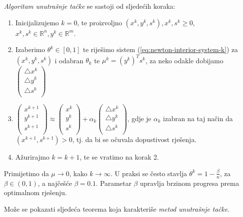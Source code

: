 \documentclass[a4paper, utf8, 11pt, colorlinks]{article}
\begin{document}
\emph{Algoritam unutrašnje tačke} se sastoji od sljedećih koraka:
\begin{enumerate}
	\item Inicijalizujemo $k=0$, te proizvoljno  $(x^k, y^k, s^k), x^k, s^k \geq 0$, $x^k,s^k \in \mathbb{R}^n, y^k \in \mathbb{R}^m$.
	\item Izaberimo $ \theta^k \in [0, 1]$ te riješimo sistem (\ref{eq:newton-interior-system-k}) za $(x^k,y^k,s^k)$ i odabran $\theta_k$ te $\mu^k = (y^k)^T s^k $, za neko odakle   dobijamo
	$  
	\begin{pmatrix}
		\bigtriangleup x^k      \\
		\bigtriangleup y^k       \\
		\bigtriangleup s^k       \\
	\end{pmatrix}    
	$
	
	\item $ 
	\begin{pmatrix}
		x^{k+1}  \\
		y^{k+1}   \\
		s^{k+1}   \\
	\end{pmatrix} \approx
	\begin{pmatrix}
		x^k  \\
		y^k  \\
		s^k  \\
	\end{pmatrix} +   
	\alpha_k 
	\begin{pmatrix}
		\bigtriangleup x^k       \\
		\bigtriangleup y^k       \\
		\bigtriangleup s^k       \\
	\end{pmatrix}  
	$, gdje je $\alpha_k$ izabran na taj način da $(x^{k+1}, s^{k+1}) > 0$, tj. da bi se očuvala dopustivost rješenja. 
	\item Ažurirajmo $k = k + 1$, te se vratimo na korak 2.
\end{enumerate}
Primijetimo da $\mu \rightarrow 0$, kako $k \rightarrow \infty$. U praksi se često stavlja $\theta^k = 1 - \frac{\beta}{n}$, za $\beta \in (0,1)$, a najčešće $\beta= 0.1$.  Parametar $\beta$ upravlja brzinom progresa prema optimalnom rješenju.  


Može se pokazati sljedeća teorema koja karakteriše \emph{metod unutrašnje tačke}.
\end{document}
